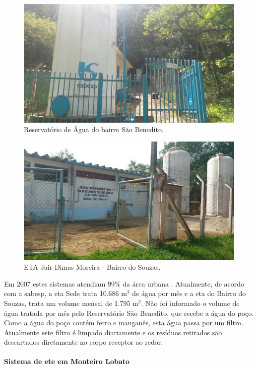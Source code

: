 \begin{figure}
	\centering
	\includegraphics[width=0.75\linewidth]{produtos/prodtres/image056}
	\caption{Reservatório de Água do bairro São Benedito.}
	\label{fig:image056}
\end{figure}


\begin{figure}
	\centering
	\includegraphics[width=0.75\linewidth]{produtos/prodtres/image057}
	\caption{ETA Jair Dimas Moreira - Bairro do Souzas.}
	\label{fig:image057}
\end{figure}


Em 2007 estes sistemas atendiam 99\% da área urbana \cite{MonteiroLobato}. Atualmente, de acordo com a \gls{sabesp}, a \gls{eta} Sede trata 10.686 m$^{3}$ de água por mês e a \gls{eta} do Bairro do Souzas, trata um volume mensal de 1.795 m$^{3}$. Não foi informado o volume de água tratada por mês pelo Reservatório São Benedito, que recebe a água do poço. Como a água do poço contém ferro e manganês, esta água passa por um filtro. Atualmente este filtro é limpado diariamente e os resíduos retirados são descartados diretamente no corpo receptor ao redor.

\paragraph{\textbf{Sistema de \gls{ete} em Monteiro Lobato}}

